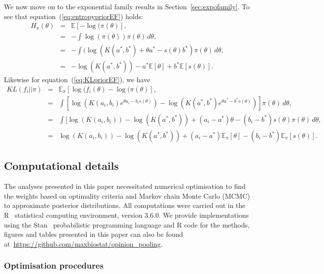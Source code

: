 \documentclass[a4paper, notitlepage, 11pt]{article}
\begin{document}
We now move on to the exponential family results in Section~\ref{sec:expofamily}.
To see that equation~(\ref{eq:entropypriorEF}) holds:
\begin{eqnarray*} 
H_\pi(\theta) & = & \mathbb{E}[-\log(\pi(\theta)], \\
              & = & - \int \log(\pi(\theta)) \pi(\theta) \, d\theta, \\
              & = & - \int (\log(K(a^*, b^*) + \theta a^* - s(\theta) b^*) \pi(\theta) \, d\theta, \\
              & = & - \log(K(a^*, b^*)) - a^*  \mathbb{E}[\theta] +  b^*  \mathbb{E}[s(\theta)].
\end{eqnarray*}
Likewise for equation~(\ref{eq:KLpriorEF}), we have 
\begin{eqnarray*} 
KL(f_i || \pi) & = & \mathbb{E}_\pi[\log(f_i(\theta)-\log(\pi(\theta)], \\
              & = & \int [\log( K(a_i,b_i) e^{\theta a_i - b_i s(\theta)}) - \log(K(a^*,b^*) e^{\theta a^* - b^* s(\theta)}) ] \pi(\theta) \, d\theta, \\
              & = & \int [\log( K(a_i,b_i)) - \log(K(a^*,b^*)) + (a_i - a^*) \theta  - (b_i - b^*) s(\theta) \pi(\theta) \, d\theta, \\
              & = & \log( K(a_i,b_i)) - \log(K(a^*,b^*)) + (a_i - a^*) \mathbb{E}_\pi[\theta] - (b_i - b^*) \mathbb{E}_\pi[s(\theta)]. 
\end{eqnarray*}

\newpage
\subsection{Computational details}
\label{sec:appendix_compdetails}

The analyses presented in this paper necessitated numerical optimisation to find the weights based on optimality criteria and Markov chain Monte Carlo (MCMC) to approximate posterior distributions.
All computations were carried out in the R~\citep{R2019} statistical computing environment, version 3.6.0. 
We provide implementations using the Stan~\citep{Carpenter2017} probabilistic programming language and R code for the methods, figures and tables presented in this paper can also be found at~\url{https://github.com/maxbiostat/opinion_pooling}.

\subsubsection{Optimisation procedures}
\label{sec:computation_opt}
\end{document}

